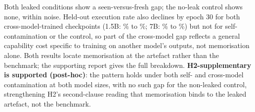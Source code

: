 Both leaked conditions show a seen-versus-fresh gap; the no-leak control shows none, within noise. Held-out execution rate also declines by epoch 30 for both cross-model-trained checkpoints (1.5B: \HSuppOneFiveBDeclineEpochZero{}\% to \HSuppOneFiveBDeclineEpochThirty{}\%; 7B: \HSuppSevenBDeclineEpochZero{}\% to \HSuppSevenBDeclineEpochThirty{}\%) but not for self-contamination or the control, so part of the cross-model gap reflects a general capability cost specific to training on another model's outputs, not memorisation alone. Both results locate memorisation at the artefact rather than the benchmark; the supporting report gives the full breakdown. \textbf{H2-supplementary is supported (post-hoc)}: the pattern holds under both self- and cross-model contamination at both model sizes, with no such gap for the non-leaked control, strengthening H2's second-clause reading that memorisation binds to the leaked artefact, not the benchmark. %

